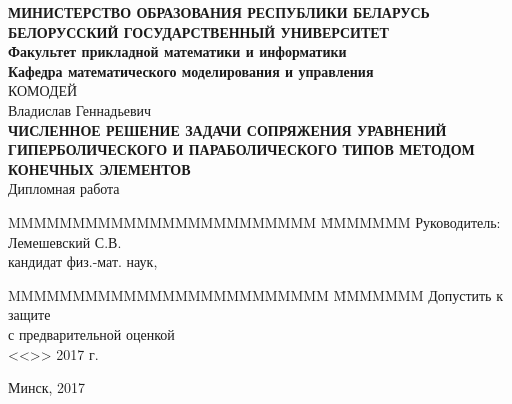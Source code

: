 \begin{titlepage}
    \begin{center}
        \normalsize {\bf МИНИСТЕРСТВО ОБРАЗОВАНИЯ РЕСПУБЛИКИ БЕЛАРУСЬ} \\
        \vspace{0.5cm}
        \normalsize {\bf БЕЛОРУССКИЙ ГОСУДАРСТВЕННЫЙ УНИВЕРСИТЕТ} \\
        \vspace{0.5cm}
        \normalsize {\bf Факультет прикладной математики и информатики} \\
        \vspace{0.5cm}
        \normalsize {\bf Кафедра математического моделирования и управления} \\
        \vspace{2cm}
        КОМОДЕЙ \\
        Владислав Геннадьевич \\
        \vspace{1cm}
        \normalsize {\bf ЧИСЛЕННОЕ РЕШЕНИЕ ЗАДАЧИ СОПРЯЖЕНИЯ УРАВНЕНИЙ 
        ГИПЕРБОЛИЧЕСКОГО И ПАРАБОЛИЧЕСКОГО ТИПОВ МЕТОДОМ КОНЕЧНЫХ ЭЛЕМЕНТОВ}\\
        \vspace{1cm}
        \normalsize Дипломная работа \\
        \vspace{2cm}
        \begin{tabbing}
            MMMMMMMMMMMMMMMMMMMMMMMM \= MMMMMMM \kill
            \> Руководитель: \\
            \> Лемешевский С.В. \\
            \>  кандидат физ.-мат. наук, 
        \end{tabbing}
        \begin{tabbing}
            MMMMMMMMMMMMMMMMMMMMMMMMM \= MMMMMMM \kill
            Допустить к защите \>  \\
            с предварительной оценкой \underline{\hspace{0.5cm}} \\
            <<\underline{\hspace{1cm}}>> \underline{\hspace{3.3cm}} 2017 г.
        \end{tabbing}

        \vspace{2cm}

        \large Минск, 2017
    \end{center}
\end{titlepage}
